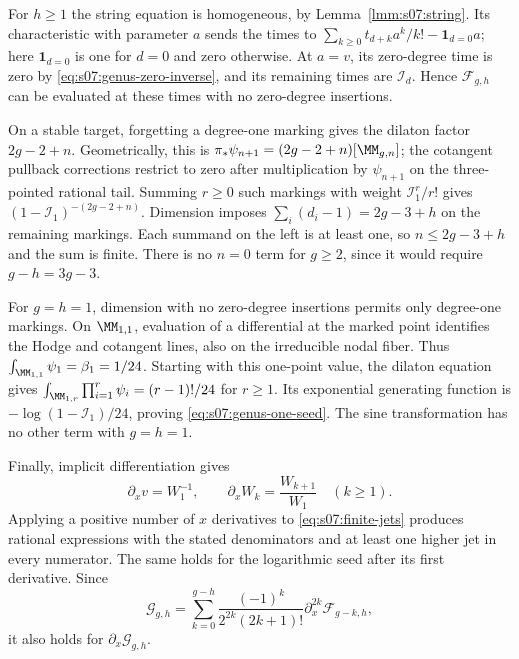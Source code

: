 \begin{prf}
For $h\geq1$ the string equation is homogeneous, by
Lemma~\ref{lmm:s07:string}. Its characteristic with parameter $a$
sends the times to
$\sum_{k\geq0}t_{d+k}a^k/k!-\mathbf1_{d=0}a$; here
$\mathbf1_{d=0}$ is one for $d=0$ and zero otherwise.
At $a=v$, its zero-degree time is zero by
\eqref{eq:s07:genus-zero-inverse}, and its remaining times are
$\mathcal I_d$. Hence $\mathcal F_{g,h}$ can be evaluated at these
times with no zero-degree insertions.

On a stable target, forgetting a degree-one marking gives the dilaton
factor $2g-2+n$. Geometrically, this is
$\pi_*\psi_{n+1}=(2g-2+n)[\MM_{g,n}]$; the cotangent pullback
corrections restrict to zero after multiplication by $\psi_{n+1}$
on the three-pointed rational tail. Summing $r\geq0$ such markings
with weight $\mathcal I_1^r/r!$ gives
$(1-\mathcal I_1)^{-(2g-2+n)}$. Dimension imposes
$\sum_i(d_i-1)=2g-3+h$ on the remaining markings. Each summand on
the left is at least one, so $n\leq2g-3+h$ and the sum is finite.
There is no $n=0$ term for $g\geq2$, since it would require
$g-h=3g-3$.

For $g=h=1$, dimension with no zero-degree insertions permits only
degree-one markings. On $\MM_{1,1}$, evaluation of a differential at
the marked point identifies the Hodge and cotangent lines, also on
the irreducible nodal fiber. Thus
$\int_{\MM_{1,1}}\psi_1=\beta_1=1/24$.
Starting with this one-point value, the dilaton equation gives
$\int_{\MM_{1,r}}\prod_{i=1}^r\psi_i=(r-1)!/24$ for $r\geq1$.
Its exponential generating function is
$-\log(1-\mathcal I_1)/24$, proving
\eqref{eq:s07:genus-one-seed}. The sine transformation has no
other term with $g=h=1$.

Finally, implicit differentiation gives
\begin{equation}\label{eq:s07:jet-x}
 \partial_xv=W_1^{-1},\qquad
 \partial_xW_k=\frac{W_{k+1}}{W_1}\quad(k\geq1).
\end{equation}
Applying a positive number of $x$ derivatives to
\eqref{eq:s07:finite-jets} produces rational expressions with the
stated denominators and at least one higher jet in every numerator.
The same holds for the logarithmic seed after its first derivative.
Since
\[
 \mathcal G_{g,h}
 =\sum_{k=0}^{g-h}\frac{(-1)^k}{2^{2k}(2k+1)!}
                           \partial_x^{2k}\mathcal F_{g-k,h},
\]
it also holds for $\partial_x\mathcal G_{g,h}$.
\end{prf}

